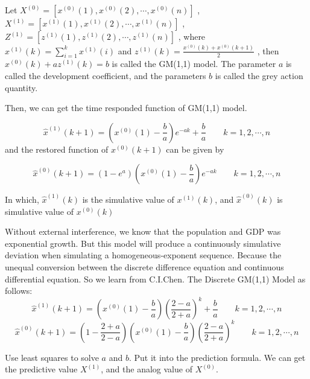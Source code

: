 \documentclass{mcmthesis}
\begin{document}
\par Let $X^{(0)}=[x^{(0)}(1), x^{(0)}(2),\cdots ,x^{(0)}(n)]$ , $X^{(1)}=[x^{(1)}(1), x^{(1)}(2),\cdots ,x^{(1)}(n)]$ , $Z^{(1)}=[z^{(1)}(1), z^{(1)}(2),\cdots ,z^{(1)}(n)]$ , where $x^{(1)}(k) =  \sum\limits_{i=1}^k x^{(1)}(i)$ and $z^{(1)}(k) = \frac{x^{(0)}(k) + x^{(0)}(k+1)}{2}$ , then $x^{(0)}(k) + a z^{(1)}(k) = b$ is called the GM(1,1) model. The parameter $a$ is called the development coefficient, and the parameters $b$ is called the grey action quantity.
 
Then, we can get the time responded function of GM(1,1) model.

\begin{equation}
\hat{x}^{(1)}(k+1) = (x^{(0)}(1) - \frac{b}{a})e^{-a k} + \frac{b}{a} \qquad k = 1, 2, \cdots, n
\end{equation}
and the restored function of $x^{(0)}(k + 1)$ can be given by

\begin{equation}
\hat{x}^{(0)}(k+1) = (1 - e^a)(x^{(0)}(1) - \frac{b}{a})e^{-a k} \qquad k = 1, 2, \cdots, n
\end{equation}

\par In which, $\hat{x}^{(1)}(k)$ is the simulative value of  $x^{(1)}(k)$, and  $\hat{x}^{(0)}(k)$ is simulative value of $x^{(0)}(k)$

\par Without external interference, we know that the population and GDP was exponential growth. But this model will produce a continuously simulative deviation when simulating a homogeneous-exponent sequence. Because the unequal conversion between the discrete difference equation and continuous differential equation. So we learn from C.I.Chen\upcite{}. The Discrete GM(1,1) Model as follows:
\begin{equation}
\hat{x}^{(1)}(k+1) = (x^{(0)}(1) - \frac{b}{a})(\frac{2 - a}{2 + a})^k+ \frac{b}{a} \qquad k = 1, 2, \cdots, n
\end{equation}
\begin{equation}
\hat{x}^{(0)}(k+1) = (1 - \frac{2 + a}{2 - a})(x^{(0)}(1) - \frac{b}{a})(\frac{2 - a}{2 + a})^k \qquad k = 1, 2, \cdots, n
\end{equation}
\par Use least squares to solve $a$ and $b$. Put it into the prediction formula. We can get the predictive value $X^{(1)}$, and the analog value of $X^{(0)}$.\\
\end{document}
